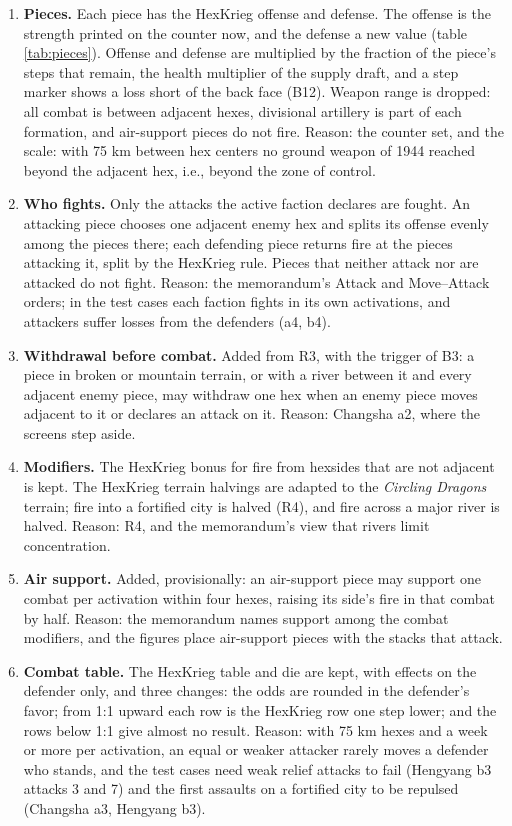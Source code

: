 \documentclass[11pt]{article}
\begin{document}
\begin{enumerate}[label=M\arabic*.,leftmargin=*,itemsep=3pt]
\item \textbf{Pieces.} Each piece has the HexKrieg offense and defense. The offense is the strength printed on the counter now, and the defense a new value (table \ref{tab:pieces}). Offense and defense are multiplied by the fraction of the piece's steps that remain, the health multiplier of the supply draft, and a step marker shows a loss short of the back face (B12). Weapon range is dropped: all combat is between adjacent hexes, divisional artillery is part of each formation, and air-support pieces do not fire. Reason: the counter set, and the scale: with 75 km between hex centers no ground weapon of 1944 reached beyond the adjacent hex, i.e., beyond the zone of control.
\item \textbf{Who fights.} Only the attacks the active faction declares are fought. An attacking piece chooses one adjacent enemy hex and splits its offense evenly among the pieces there; each defending piece returns fire at the pieces attacking it, split by the HexKrieg rule. Pieces that neither attack nor are attacked do not fight. Reason: the memorandum's Attack and Move--Attack orders; in the test cases each faction fights in its own activations, and attackers suffer losses from the defenders (a4, b4).
\item \textbf{Withdrawal before combat.} Added from R3, with the trigger of B3: a piece in broken or mountain terrain, or with a river between it and every adjacent enemy piece, may withdraw one hex when an enemy piece moves adjacent to it or declares an attack on it. Reason: Changsha a2, where the screens step aside.
\item \textbf{Modifiers.} The HexKrieg bonus for fire from hexsides that are not adjacent is kept. The HexKrieg terrain halvings are adapted to the \emph{Circling Dragons} terrain; fire into a fortified city is halved (R4), and fire across a major river is halved. Reason: R4, and the memorandum's view that rivers limit concentration.
\item \textbf{Air support.} Added, provisionally: an air-support piece may support one combat per activation within four hexes, raising its side's fire in that combat by half. Reason: the memorandum names support among the combat modifiers, and the figures place air-support pieces with the stacks that attack.
\item \textbf{Combat table.} The HexKrieg table and die are kept, with effects on the defender only, and three changes: the odds are rounded in the defender's favor; from 1:1 upward each row is the HexKrieg row one step lower; and the rows below 1:1 give almost no result. Reason: with 75 km hexes and a week or more per activation, an equal or weaker attacker rarely moves a defender who stands, and the test cases need weak relief attacks to fail (Hengyang b3 attacks 3 and 7) and the first assaults on a fortified city to be repulsed (Changsha a3, Hengyang b3).

\end{enumerate}
\end{document}
